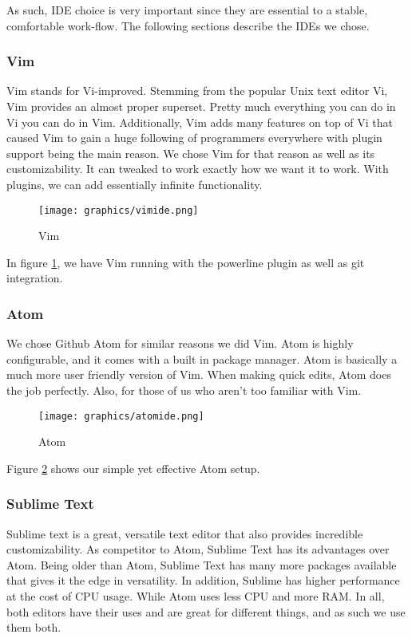 \documentclass[letterpaper, 11pt]{article}
\begin{document}
As such, IDE choice is very important since they are essential to a stable, comfortable
work-flow. The following sections describe the IDEs we chose.

\subsubsection{Vim}

Vim stands for Vi-improved. Stemming from the popular Unix text editor Vi, Vim
provides an almost proper superset. Pretty much everything you can do in Vi you
can do in Vim. Additionally, Vim adds many features on top of Vi that caused Vim
to gain a huge following of programmers everywhere with plugin support being the main
reason. We chose Vim for that reason as well as its customizability. It can tweaked
to work exactly how we want it to work. With plugins, we can add essentially infinite
functionality.

\begin{figure}
    \centering
	\texttt{[image: graphics/vimide.png]}
    \caption{Vim} \label{vim}
\end{figure}

In figure \ref{vim}, we have Vim running with the powerline plugin as
well as git integration. 
 
\newpage

\subsubsection{Atom}
We chose Github Atom for similar reasons we did Vim. Atom is highly configurable, and it
comes with a built in package manager. Atom is basically a much more user friendly
version of Vim. When making quick edits, Atom does the job perfectly. Also, for
those of us who aren't too familiar with Vim.

\begin{figure}
    \centering
	\texttt{[image: graphics/atomide.png]}
    \caption{Atom} \label{atom}
\end{figure}

Figure \ref{atom} shows our simple yet effective Atom setup.

\newpage

\subsubsection{Sublime Text}
Sublime text is a great, versatile text editor that also provides incredible customizability.
As competitor to Atom, Sublime Text has its advantages over Atom. Being older than Atom,
Sublime Text has many more packages available that gives it the edge in versatility. In
addition, Sublime has higher performance at the cost of CPU usage. While Atom uses less
CPU and more RAM. In all, both editors have their uses and are great for different things,
and as such we use them both.  
\end{document}
